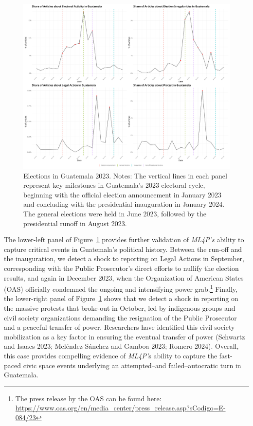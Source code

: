 \documentclass[
  letterpaper,
  DIV=11,
  numbers=noendperiod]{scrartcl}
\begin{document}
\begin{figure}

{\centering \includegraphics{event_validation/Combined_GTM2023_Plots.png}

}

\caption{\label{fig-gt_2023}Elections in Guatemala 2023. Notes: The
vertical lines in each panel represent key milestones in Guatemala's
2023 electoral cycle, beginning with the official election announcement
in January 2023 and concluding with the presidential inauguration in
January 2024. The general elections were held in June 2023, followed by
the presidential runoff in August 2023.}

\end{figure}

The lower-left panel of Figure~\ref{fig-gt_2023} provides further
validation of \emph{ML4P's} ability to capture critical events in
Guatemala's political history. Between the run-off and the inauguration,
we detect a shock to reporting on Legal Actions in September,
corresponding with the Public Prosecutor's direct efforts to nullify the
election results, and again in December 2023, when the Organization of
American States (OAS) officially condemned the ongoing and intensifying
power grab.\footnote{The press release by the OAS can be found here:
  \url{https://www.oas.org/en/media_center/press_release.asp?sCodigo=E-084/23}}
Finally, the lower-right panel of Figure~\ref{fig-gt_2023} shows that we
detect a shock in reporting on the massive protests that broke-out in
October, led by indigenous groups and civil society organizations
demanding the resignation of the Public Prosecutor and a peaceful
transfer of power. Researchers have identified this civil society
mobilization as a key factor in ensuring the eventual transfer of power
(Schwartz and Isaacs 2023; Meléndez-Sánchez and Gamboa 2023; Romero
2024). Overall, this case provides compelling evidence of \emph{ML4P'}s
ability to capture the fast-paced civic space events underlying an
attempted--and failed--autocratic turn in Guatemala.
\end{document}
